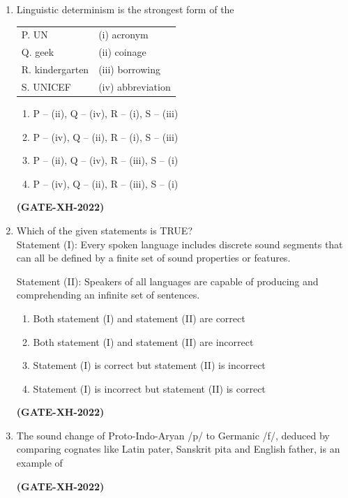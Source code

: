 \documentclass[journal]{IEEEtran}
\begin{document}
\begin{enumerate}
\item Linguistic determinism is the strongest form of the
\begin{tabular}{|p{3cm}|p{3cm}|}
\hline
   P. UN  &(i) acronym \\
   Q. geek  &(ii) coinage\\
   R. kindergarten &(iii) borrowing\\
   S. UNICEF &(iv) abbreviation\\
\hline
\end{tabular}
\vspace{0.2cm}
\begin{enumerate}
\item P – (ii), Q – (iv), R – (i), S – (iii)
\item P – (iv), Q – (ii), R – (i), S – (iii)
\item P – (ii), Q – (iv), R – (iii), S – (i)
\item P – (iv), Q – (ii), R – (iii), S – (i)
\end{enumerate}
\hfill\textbf{(GATE-XH-2022)}

\item Which of the given statements is TRUE?\\
Statement (I): Every spoken language includes discrete sound segments that can all be defined by a finite set of sound properties or features.

Statement (II): Speakers of all languages are capable of producing and comprehending an infinite set of sentences.
\begin{enumerate}
\item Both statement (I) and statement (II) are correct
\item Both statement (I) and statement (II) are incorrect
\item Statement (I) is correct but statement (II) is incorrect
\item Statement (I) is incorrect but statement (II) is correct
\end{enumerate}
\hfill\textbf{(GATE-XH-2022)}

\item The sound change of Proto-Indo-Aryan /p/ to Germanic /f/, deduced by comparing cognates like Latin pater, Sanskrit pita and English father, is an example of
\begin{enumerate}
\end{enumerate}
\hfill\textbf{(GATE-XH-2022)}


\end{enumerate}
\end{document}
